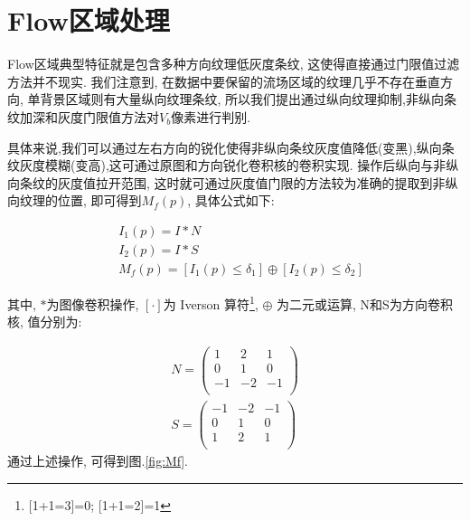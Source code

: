 
\section{Flow区域处理}

Flow区域典型特征就是包含多种方向纹理低灰度条纹, 这使得直接通过门限值过滤方法并不现实. 我们注意到, 在数据中要保留的流场区域的纹理几乎不存在垂直方向, 单背景区域则有大量纵向纹理条纹, 所以我们提出通过纵向纹理抑制,非纵向条纹加深和灰度门限值方法对$V_b$像素进行判别.

具体来说,我们可以通过左右方向的锐化使得非纵向条纹灰度值降低(变黑),纵向条纹灰度模糊(变高),这可通过原图和方向锐化卷积核的卷积实现. 操作后纵向与非纵向条纹的灰度值拉开范围, 这时就可通过灰度值门限的方法较为准确的提取到非纵向纹理的位置, 即可得到$M_f(p)$, 具体公式如下:


\begin{eqnarray}
\nonumber
\quad&I_1(p) = I \ast N&\\
\nonumber
\quad&I_2(p) = I \ast S&\\
\nonumber
\quad&M_f(p) = [I_1(p) \le \delta_1] \oplus [I_2(p) \le \delta_2]&
\end{eqnarray}

其中, $\ast$为图像卷积操作, $[\cdot]$为 Iverson 算符\footnote{[1+1=3]=0;
[1+1=2]=1}, $\oplus$ 为二元或运算, N和S为方向卷积核, 值分别为:

\begin{eqnarray}
	\nonumber
	N = \left(                
		\begin{array}{ccc} 
		  1 & 2 & 1\\  
		  0 & 1 & 0\\  
		  -1&-2&-1\\
		\end{array}
	  \right) \\
	  \nonumber
	  S = \left(                
		  \begin{array}{ccc} 
			-1 & -2 & -1\\  
			0 & 1 & 0\\  
			1&2&1\\
		  \end{array}
		\right) 
\end{eqnarray}
 通过上述操作, 可得到图.\ref{fig:Mf}.




